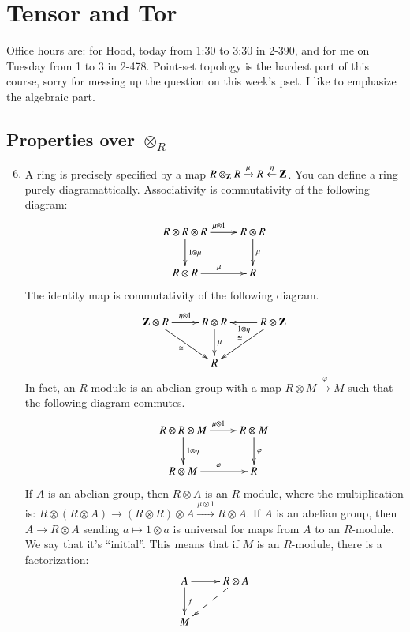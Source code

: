 \section{Tensor and Tor}
Office hours are: for Hood, today from 1:30 to 3:30 in 2-390, and for me on Tuesday from 1 to 3 in 2-478. Point-set topology is the hardest part of this course, sorry for messing up the question on this week's pset. I like to emphasize the algebraic part.
\subsection{Properties over $\otimes_R$}
\begin{enumerate}
\setcounter{enumi}{5}
\item A ring is precisely specified by a map $R\otimes_\mathbf Z R\xrightarrow{\mu}R\xleftarrow{\eta}\mathbf Z$. You can define a ring purely diagramattically. Associativity is commutativity of the following diagram:
\begin{equation*}
\xymatrix{R\otimes R\otimes R\ar[r]^{\mu\otimes 1}\ar[d]^{1\otimes \mu} & R\otimes R\ar[d]^{\mu}\\
R\otimes R\ar[r]^{\mu} & R}
\end{equation*}
The identity map is commutativity of the following diagram.
\begin{equation*}
\xymatrix{\Z\otimes R\ar[r]^{\eta\otimes 1}\ar[dr]_{\cong} & R\otimes R\ar[d]^{\mu} & R\otimes \Z\ar[l]^{1\otimes\eta}\ar[dl]_{\cong}\\
& R & }
\end{equation*}
In fact, an $R$-module is an abelian group with a map $R\otimes M\xrightarrow{\varphi}M$ such that the following diagram commutes.
\begin{equation*}
\xymatrix{R\otimes R\otimes M\ar[r]^{\mu\otimes 1}\ar[d]^{1\otimes \eta} & R\otimes M\ar[d]^{\varphi}\\
R\otimes M\ar[r]^{\varphi} & R}
\end{equation*}
If $A$ is an abelian group, then $R\otimes A$ is an $R$-module, where the multiplication is: $R\otimes(R\otimes A)\to (R\otimes R)\otimes A\xrightarrow{\mu\otimes 1}R\otimes A$. If $A$ is an abelian group, then $A\to R\otimes A$ sending $a\mapsto 1\otimes a$ is universal for maps from $A$ to an $R$-module. We say that it's ``initial''. This means that if $M$ is an $R$-module, there is a factorization:
\begin{equation*}
\xymatrix{A\ar[r]\ar[d]^f & R\otimes A\ar@{-->}[dl]\\
M}
\end{equation*}

\end{enumerate}
